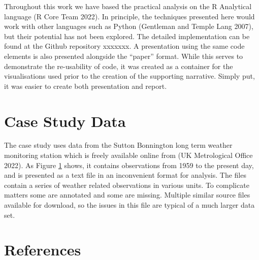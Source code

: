 \documentclass[smallextended]{svjour3}       %
\begin{document}
Throughout this work we have based the practical analysis on the R Analytical language (R Core Team 2022). In principle, the techniques presented here would work with other languages such as Python
(Gentleman and Temple Lang 2007), but their potential has not been explored. The detailed implementation can be found at the Github repository xxxxxxx. A presentation using the same code elements is also presented alongside the ``paper'' format. While this serves to demonstrate the re-usability of code, it was created as a container for the visualisations used prior to the creation of the supporting narrative. Simply put, it was easier to create both presentation and report.

\hypertarget{sec:case-study}{%
\section{Case Study Data}\label{sec:case-study}}

The case study uses data from the Sutton Bonnington long term
weather monitoring station which is freely available online from
(UK Metrological Office 2022). As
Figure \protect\hyperlink{fig:suttonbonningtondata}{1} shows, it contains observations
from 1959 to the present day, and is presented as a text file in an
inconvenient format for analysis. The files contain a series of weather
related observations in various units. To complicate matters some are
annotated and some are missing. Multiple similar source files available
for download, so the issues in this file are typical of a much larger
data set.

\hypertarget{references}{%
\section*{References}\label{references}}
\end{document}
